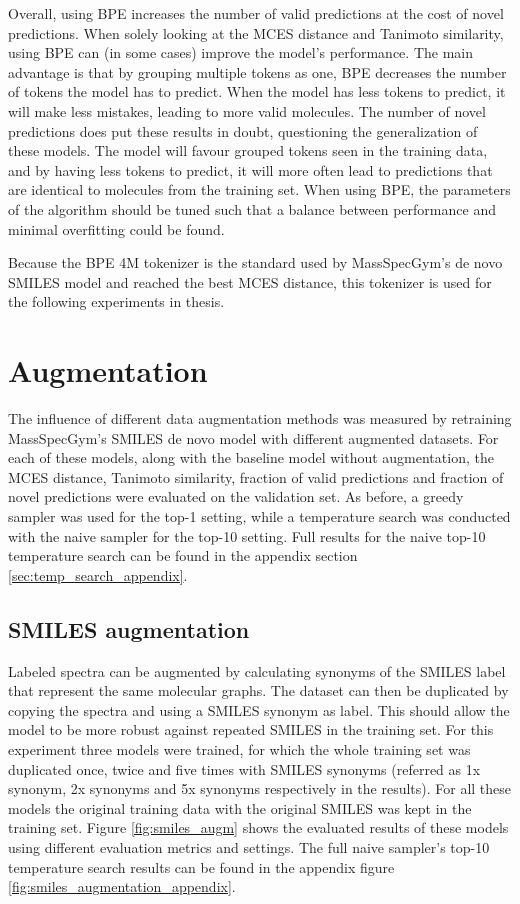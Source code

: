 Overall, using \ac{BPE} increases the number of valid predictions at the cost of novel predictions.
When solely looking at the MCES distance and Tanimoto similarity, using \ac{BPE} can (in some cases) improve the model's performance.
The main advantage is that by grouping multiple tokens as one, \ac{BPE} decreases the number of tokens the model has to predict.
When the model has less tokens to predict, it will make less mistakes, leading to more valid molecules.
The number of novel predictions does put these results in doubt, questioning the generalization of these models.
The model will favour grouped tokens seen in the training data, and by having less tokens to predict, it will more often lead to predictions that are identical to molecules from the training set.
When using \ac{BPE}, the parameters of the algorithm should be tuned such that a balance between performance and minimal overfitting could be found.

Because the \ac{BPE} 4M tokenizer is the standard used by MassSpecGym's de novo SMILES model and reached the best MCES distance, this tokenizer is used for the following experiments in thesis. 

\section{Augmentation}

The influence of different data augmentation methods was measured by retraining MassSpecGym's SMILES de novo model with different augmented datasets.
For each of these models, along with the baseline model without augmentation, the MCES distance, Tanimoto similarity, fraction of valid predictions and fraction of novel predictions were evaluated on the validation set.
As before, a greedy sampler was used for the top-1 setting, while a temperature search was conducted with the naive sampler for the top-10 setting.
Full results for the naive top-10 temperature search can be found in the appendix section \ref{sec:temp_search_appendix}.

\subsection{SMILES augmentation}

Labeled spectra can be augmented by calculating synonyms of the SMILES label that represent the same molecular graphs.
The dataset can then be duplicated by copying the spectra and using a SMILES synonym as label.
This should allow the model to be more robust against repeated SMILES in the training set.
For this experiment three models were trained, for which the whole training set was duplicated once, twice and five times with SMILES synonyms (referred as 1x synonym, 2x synonyms and 5x synonyms respectively in the results).
For all these models the original training data with the original SMILES was kept in the training set.
Figure \ref{fig:smiles_augm} shows the evaluated results of these models using different evaluation metrics and settings.
The full naive sampler's top-10 temperature search results can be found in the appendix figure \ref{fig:smiles_augmentation_appendix}.

